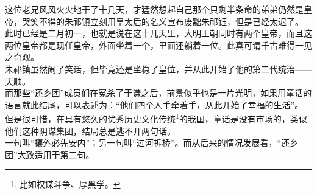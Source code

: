 \begin{multicols}{\theparacolNo}
这位老兄风风火火地干了十几天，才猛然想起自己那个只剩半条命的弟弟仍然是皇帝，哭笑不得的朱祁镇立刻用皇太后的名义宣布废黜朱祁钰，但是已经太迟了。\\

此时已经是二月初一，也就是说在这十几天里，大明王朝同时有两个皇帝，而且这两位皇帝都是现任皇帝，外面坐着一个，里面还躺着一位。此真可谓千古难得一见之奇观。\\

朱祁镇虽然闹了笑话，但毕竟还是坐稳了皇位，并从此开始了他的第二代统治——天顺。\\

而那些“还乡团”成员们在冤杀了于谦之后，前景似乎也是一片光明，如果用童话的语言就此结尾，可以表述为：“他们四个人手牵着手，从此开始了幸福的生活”。\\

但是很可惜，在具有悠久的优秀历史文化传统\footnote{比如权谋斗争、厚黑学。}的我国，童话是没有市场的，类似他们这种阴谋集团，结局总是逃不开两句话。\\

一句叫“攘外必先安内”；另一句叫“过河拆桥”。而从后来的情况发展看，“还乡团”大致适用于第二句。\\
\ifnum{}
	\end{multicols}
\fi
\newpage
